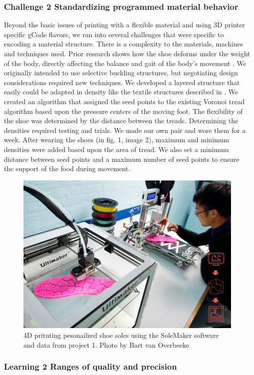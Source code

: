 \subsubsection{Challenge 2 Standardizing programmed material behavior }

Beyond the basic issues of printing with a flexible material and using 3D printer specific gCode flavors, we ran into several challenges that were specific to encoding a material structure. There is a complexity to the materials, machines and techniques used. Prior research shows how the shoe deforms under the weight of the body, directly affecting the balance and gait of the body's movement \cite{Franklyn-Miller2014}. We originally intended to use selective buckling structures, but negotiating design considerations required new techniques. 
We developed a layered structure that easily could be adapted in density like the textile structures described in \cite{nachtigall2018towards}. We created an algorithm that assigned the seed points to the existing Voronoi tread algorithm based upon the pressure centers of the moving foot. The flexibility of the shoe was determined by the distance between the treads. Determining the densities required testing and trials. We made our own pair and wore them for a week. After wearing the shoes (in fig. 1, image 2), maximum and minimum densities were added based upon the area of tread. We also set a minimum distance between seed points and a maximum number of seed points to ensure the support of the food during movement.


\begin{figure}
\includegraphics[width=.5\textwidth]{Printing}
\caption{4D pritnting pesonailzed shoe soles using the SoleMaker software and data from project 1. Photo by Bart van Overbeeke}
\label{fig:Project2}
\end{figure}

\subsubsection{Learning 2 Ranges of quality and precision}

